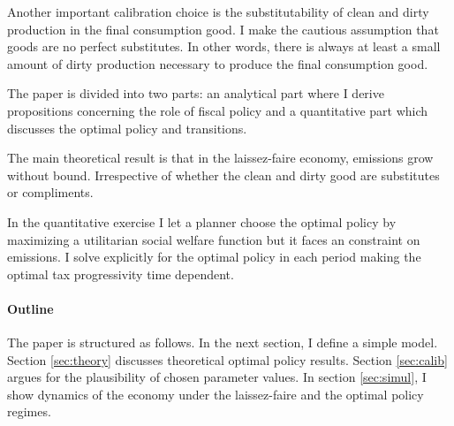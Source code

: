 Another important calibration choice is the substitutability of clean and dirty production in the final consumption good. I make the cautious assumption that goods are no perfect substitutes. In other words, there is always at least a small amount of dirty production necessary to produce the final consumption good. 

The paper is divided into two parts: an analytical part where I derive propositions concerning the role of fiscal policy and a quantitative part which discusses the optimal policy and transitions. 

The main theoretical result is that in the laissez-faire economy, emissions grow without bound. Irrespective of whether the clean and dirty good are substitutes or compliments.

In the quantitative exercise I let a planner choose the optimal policy by maximizing a utilitarian social welfare function but it faces an constraint on emissions. I solve explicitly for the optimal policy in each period making the optimal tax progressivity time dependent. 




\paragraph{Outline}
The paper is structured as follows. In the next section, I define a simple model. %
Section \ref{sec:theory} discusses theoretical optimal policy results. Section \ref{sec:calib} argues for the plausibility of chosen parameter values. In section \ref{sec:simul}, I show dynamics of the economy under the laissez-faire and the optimal policy regimes. 

